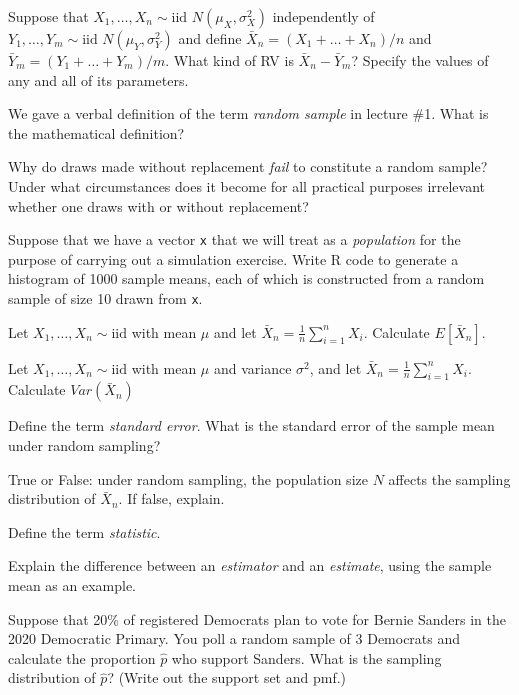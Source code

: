 \documentclass[addpoints,12pt]{exam}
\begin{document}
\begin{questions}
\question Suppose that $X_1, \dots, X_n \sim \text{iid } N(\mu_X, \sigma_X^2)$ independently of $Y_1, \dots, Y_m \sim \text{iid } N(\mu_Y, \sigma^2_Y)$ and define $\bar{X}_n = (X_1 + \dots + X_n)/n$ and $\bar{Y}_m = (Y_1 + \dots + Y_m)/m$.
What kind of RV is $\bar{X}_n - \bar{Y}_m$? 
Specify the values of any and all of its parameters.


\question We gave a verbal definition of the term \emph{random sample} in lecture \#1. What is the mathematical definition?

\question Why do draws made without replacement \emph{fail} to constitute a random sample? Under what circumstances does it become for all practical purposes irrelevant whether one draws with or without replacement?

\question Suppose that we have a vector \texttt{x} that we will treat as a \emph{population} for the purpose of carrying out a simulation exercise.
Write R code to generate a histogram of 1000 sample means, each of which is constructed from a random sample of size 10 drawn from \texttt{x}.

\question Let $X_1, \dots, X_n \sim \text{iid}$ with mean $\mu$ and let $\bar{X}_n = \frac{1}{n}\sum_{i=1}^n X_i$. Calculate $E[\bar{X}_n]$.

\question Let $X_1, \dots, X_n \sim \text{iid}$ with mean $\mu$ and variance $\sigma^2$, and let $\bar{X}_n = \frac{1}{n}\sum_{i=1}^n X_i$. Calculate $Var(\bar{X}_n)$

\question Define the term \emph{standard error}. What is the standard error of the sample mean under random sampling?

\question True or False: under random sampling, the population size $N$ affects the sampling distribution of $\bar{X}_n$. If false, explain.

\question Define the term \emph{statistic}. 

\question Explain the difference between an \emph{estimator} and an \emph{estimate}, using the sample mean as an example.

\question Suppose that 20\% of registered Democrats plan to vote for Bernie Sanders in the 2020 Democratic Primary. 
You poll a random sample of 3 Democrats and calculate the proportion $\widehat{p}$ who support Sanders. 
What is the sampling distribution of $\widehat{p}$? 
(Write out the support set and pmf.)



\end{questions}
\end{document}
